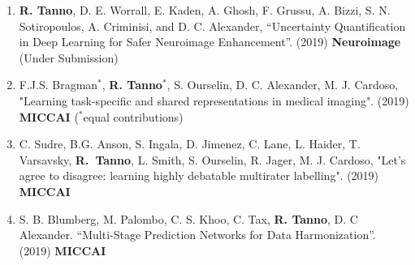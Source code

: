 \begin{enumerate}
	\item \textbf{R. Tanno}, D. E. Worrall, E. Kaden, A. Ghosh, F. Grussu, A. Bizzi, S. N. Sotiropoulos, A. Criminisi, and D. C. Alexander, “Uncertainty Quantification in Deep Learning for Safer Neuroimage Enhancement”. (2019) \textbf{Neuroimage} (Under Submission)
	
	\item F.J.S. Bragman$^*$, \textbf{R. Tanno}$^*$, S. Ourselin, D. C. Alexander, M. J. Cardoso, "Learning task-specific and shared representations in medical imaging".  (2019) \textbf{MICCAI} ($^*$equal contributions)
	
	\item C. Sudre, B.G. Anson, S. Ingala, D. Jimenez, C. Lane, L. Haider, T. Varsavsky,  \textbf{R.~Tanno}, L. Smith, S. Ourselin, R. Jager, M. J. Cardoso, "Let's agree to disagree: learning highly debatable multirater labelling".  (2019) \textbf{MICCAI} 
	
	\item S. B. Blumberg, M. Palombo, C. S. Khoo, C. Tax, \textbf{R. Tanno}, D. C Alexander. “Multi-Stage Prediction Networks for Data Harmonization”. (2019) \textbf{MICCAI }
	
\end{enumerate}


